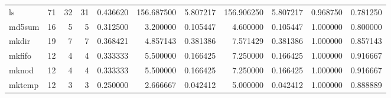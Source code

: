 \begin{tabular}{lrrrrrrrrrr}
ls        &                                      71 &                 32 &                                31 &                                   0.436620 &                             156.687500 &                                     5.807217 &                        156.906250 &                                5.807217 &                           0.968750 &                                           0.781250 \\
md5sum    &                                      16 &                  5 &                                 5 &                                   0.312500 &                               3.200000 &                                     0.105447 &                          4.600000 &                                0.105447 &                           1.000000 &                                           0.800000 \\
mkdir     &                                      19 &                  7 &                                 7 &                                   0.368421 &                               4.857143 &                                     0.381386 &                          7.571429 &                                0.381386 &                           1.000000 &                                           0.857143 \\
mkfifo    &                                      12 &                  4 &                                 4 &                                   0.333333 &                               5.500000 &                                     0.166425 &                          7.250000 &                                0.166425 &                           1.000000 &                                           0.916667 \\
mknod     &                                      12 &                  4 &                                 4 &                                   0.333333 &                               5.500000 &                                     0.166425 &                          7.250000 &                                0.166425 &                           1.000000 &                                           0.916667 \\
mktemp    &                                      12 &                  3 &                                 3 &                                   0.250000 &                               2.666667 &                                     0.042412 &                          5.000000 &                                0.042412 &                           1.000000 &                                           0.888889 \\

\end{tabular}
